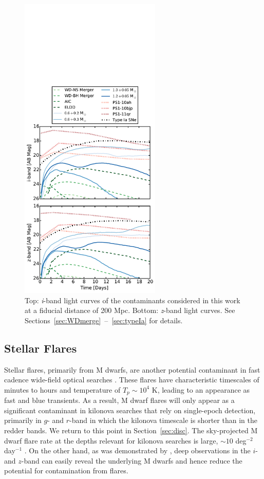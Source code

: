 \begin{figure}[h!]
\centering
\includegraphics[trim= 0 0 0 240 ,clip,width=0.6\textwidth]{./figs/chapter2/ch2_f2.pdf}
\caption{Top: {\em i}-band light curves of the contaminants considered in this work at a fiducial distance of 200 Mpc. Bottom: {\em z}-band light curves. See Sections~\ref{sec:WDmerge}~--~\ref{sec:typeIa} for details.}
\label{fig:LCcont}
\end{figure}
   
\subsection{Stellar Flares}
\label{sec:flarestar}
Stellar flares, primarily from M dwarfs, are another potential contaminant in fast cadence wide-field optical searches \citep{Becker+04,KulkarniRau06,Berger+13}.  These flares have characteristic timescales of minutes to hours \citep[see e.g.,][]{Berger+13} and temperature of $T_p \sim 10^4$ K, leading to an appearance as fast and blue transients.  As a result, M dwarf flares will only appear as a significant contaminant in kilonova searches that rely on single-epoch detection, primarily in $g$- and $r$-band in which the kilonova timescale is shorter than in the redder bands.  We return to this point in Section~\ref{sec:disc}.  The sky-projected M dwarf flare rate at the depths relevant for kilonova searches is large, $\sim 10$ deg$^{-2}$ day$^{-1}$ \citep{KulkarniRau06}.  On the other hand, as was demonstrated by \citet{Berger+13}, deep observations in the $i$- and $z$-band can easily reveal the underlying M dwarfs and hence reduce the potential for contamination from flares.

